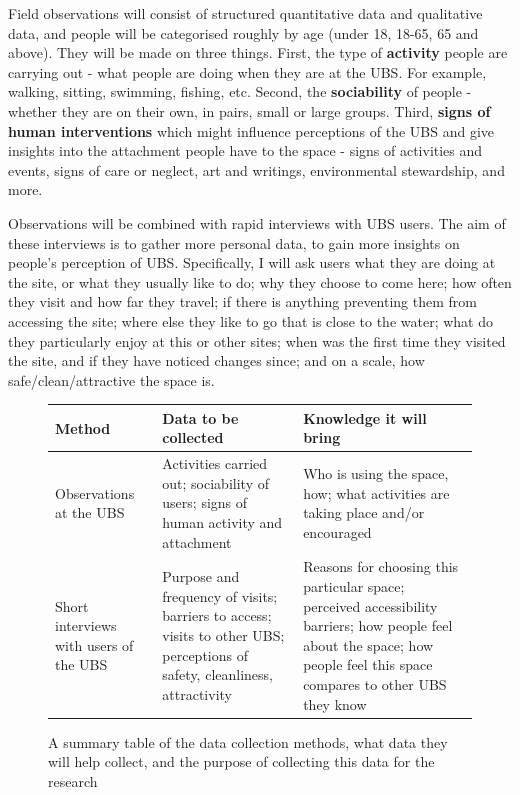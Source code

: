 \documentclass{article}
\begin{document}
Field observations will consist of structured quantitative data and qualitative data, and people will be categorised roughly by age (under 18, 18-65, 65 and above). They will be made on three things. First, the type of \textbf{activity} people are carrying out - what people are doing when they are at the UBS. For example, walking, sitting, swimming, fishing, etc. Second, the \textbf{sociability} of people - whether they are on their own, in pairs, small or large groups. Third,  \textbf{signs of human interventions} which might influence perceptions of the UBS and give insights into the attachment people have to the space - signs of activities and events, signs of care or neglect, art and writings, environmental stewardship, and more.

Observations will be combined with rapid interviews with UBS users. The aim of these interviews is to gather more personal data, to gain more insights on people’s perception of UBS. Specifically, I will ask users what they are doing at the site, or what they usually like to do; why they choose to come here; how often they visit and how far they travel; if there is anything preventing them from accessing the site; where else they like to go that is close to the water; what do they particularly enjoy at this or other sites; when was the first time they visited the site, and if they have noticed changes since; and on a scale, how safe/clean/attractive the space is.

\begin{figure}[htp]
\begin{tabularx}{\textwidth} { 
  | >{\raggedright\arraybackslash}X 
  | >{\raggedright\arraybackslash}X 
  | >{\raggedright\arraybackslash}X | }
  \hline
  Method & Data to be collected & Knowledge it will bring \\ 
     \hline
  Observations at the UBS
  & Activities carried out; sociability of users; signs of human activity and attachment
  &  Who is using the space, how; what activities are taking place and/or encouraged \\ 
  	\hline
  Short interviews with users of the UBS
  & Purpose and frequency of visits; barriers to access; visits to other UBS; perceptions of safety, cleanliness, attractivity
  & Reasons for choosing this particular space; perceived accessibility barriers; how people feel about the space; how people feel this space compares to other UBS they know \\ 
  \hline
\end{tabularx}
\caption{A summary table of the data collection methods, what data they will help collect, and the purpose of collecting this data for the research}
\end{figure}
\end{document}
